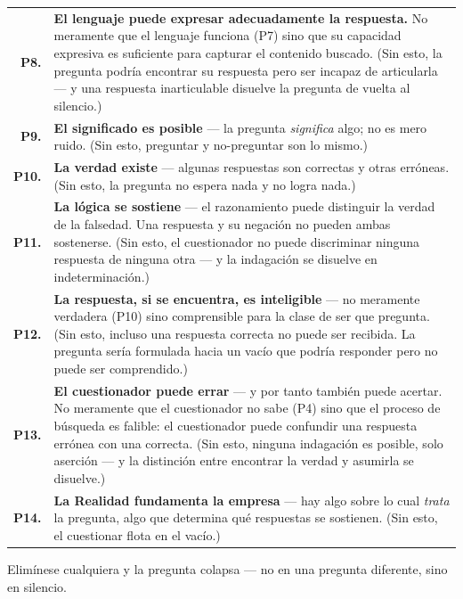 \documentclass[10pt, openany, oneside]{book}
\renewcommand{\footnotesize}{\fontsize{8.5}{11}\selectfont}
\begin{document}
{\footnotesize
\noindent\begin{tabular}{r p{}}
\textbf{P8.} & \textbf{El lenguaje puede expresar adecuadamente la respuesta.} No meramente que el lenguaje funciona (P7) sino que su capacidad expresiva es suficiente para capturar el contenido buscado. (Sin esto, la pregunta podría encontrar su respuesta pero ser incapaz de articularla --- y una respuesta inarticulable disuelve la pregunta de vuelta al silencio.) \\[0.3em]
\textbf{P9.} & \textbf{El significado es posible} --- la pregunta \textit{significa} algo; no es mero ruido. (Sin esto, preguntar y no-preguntar son lo mismo.) \\[0.3em]
\textbf{P10.} & \textbf{La verdad existe} --- algunas respuestas son correctas y otras erróneas. (Sin esto, la pregunta no espera nada y no logra nada.) \\[0.3em]
\textbf{P11.} & \textbf{La lógica se sostiene} --- el razonamiento puede distinguir la verdad de la falsedad. Una respuesta y su negación no pueden ambas sostenerse. (Sin esto, el cuestionador no puede discriminar ninguna respuesta de ninguna otra --- y la indagación se disuelve en indeterminación.) \\[0.3em]
\textbf{P12.} & \textbf{La respuesta, si se encuentra, es inteligible} --- no meramente verdadera (P10) sino comprensible para la clase de ser que pregunta. (Sin esto, incluso una respuesta correcta no puede ser recibida. La pregunta sería formulada hacia un vacío que podría responder pero no puede ser comprendido.) \\[0.3em]
\textbf{P13.} & \textbf{El cuestionador puede errar} --- y por tanto también puede acertar. No meramente que el cuestionador no sabe (P4) sino que el proceso de búsqueda es falible: el cuestionador puede confundir una respuesta errónea con una correcta. (Sin esto, ninguna indagación es posible, solo aserción --- y la distinción entre encontrar la verdad y asumirla se disuelve.) \\[0.3em]
\textbf{P14.} & \textbf{La Realidad fundamenta la empresa} --- hay algo sobre lo cual \textit{trata} la pregunta, algo que determina qué respuestas se sostienen. (Sin esto, el cuestionar flota en el vacío.) \\[0.3em]
\end{tabular}
}

\vspace{0.8em}

\noindent Elimínese cualquiera y la pregunta colapsa --- no en una pregunta diferente, sino en silencio.
\end{document}
